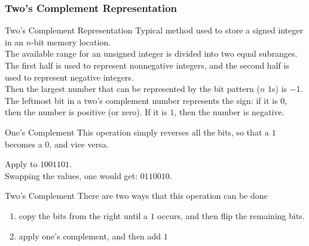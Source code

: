 \documentclass[\main/notes.tex]{subfiles}
\begin{document}
				\subsubsection{Two's Complement Representation}
					\begin{definition}{Two's Complement Representation}
						Typical method used to store a signed integer in an $n$-bit memory location.\\
						The available range for an unsigned integer is divided into two equal subranges. The first half is used to represent nonnegative integers, and the second half is used to represent negative integers.\\
						Then the largest number that can be represented by the bit pattern ($n$ $1$s) is $-1$.\\
						The leftmost bit in a two's complement number represents the sign: if it is $0$, then the number is positive (or zero). If it is $1$, then the number is negative.
					\end{definition}
					\begin{definition}{One's Complement}
						This operation simply reverses all the bits, so that a $1$ becomes a $0$, and vice versa.
					\end{definition}
					\begin{example}
						Apply  to $1001101$.\\
						Swapping the values, one would get: $0110010$.
					\end{example}
					\begin{definition}{Two's Complement}
						There are two ways that this operation can be done
						\begin{enumerate}
							\item copy the bits from the right until a $1$ occurs, and then flip the remaining bits.
							\item apply one's complement, and then add $1$
						\end{enumerate}
					\end{definition}
\end{document}
